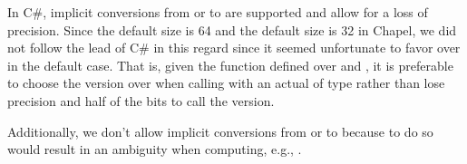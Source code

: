 
\begin{rationale}
In C\#, implicit conversions from  or 
to  are supported and allow for a loss of precision.
Since the default  size is 64 and the default 
size is 32 in Chapel, we did not follow the lead of C\# in this regard
since it seemed unfortunate to favor  over 
in the default case.  That is, given the  function defined
over  and , it is preferable to choose the
version over  when calling with an actual of
type  rather than lose precision and half of the bits to
call the  version.

Additionally, we don't allow implicit conversions from 
or  to  because to do so would result in
an ambiguity when computing, e.g., .
\end{rationale}


